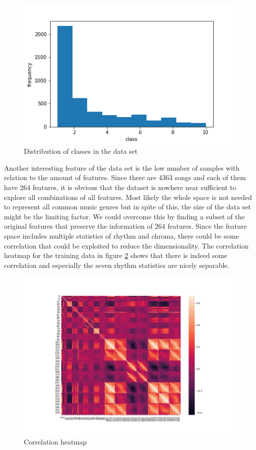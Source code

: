 \documentclass[fleqn,10pt]{SelfArx} %
\begin{document}
\begin{figure}[H]
  \includegraphics[width=\linewidth]{class-dist-hist.png}
  \caption{Distribution of classes in the data set}
  \label{fig:dist-hist}
\end{figure}

Another interesting feature of the data set is the low number of samples with
relation to the amount of features. Since there are 4363 songs and each of them
have 264 features, it is obvious that the dataset is nowhere near sufficient to
explore all combinations of all features. Most likely the whole space is not
needed to represent all common music genres but in spite of this, the size of
the data set might be the limiting factor. We could overcome this by finding a
subset of the original features that preserve the information of 264 features.
Since the feature space includes multiple statistics of rhythm and chroma, there
could be some correlation that could be exploited to reduce the dimensionality.
The correlation heatmap for the training data in figure \ref{fig:heatmap} shows
that there is indeed some correlation and especially the seven rhythm statistics
are nicely separable.

\begin{figure}[H]
  \centering
  \includegraphics[width=\linewidth]{heatmap.png}
  \caption{Correlation heatmap}
  \label{fig:heatmap}
\end{figure}
\end{document}
